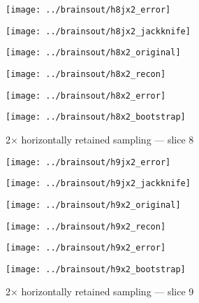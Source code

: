 \documentclass[review,supplement,onefignum,onetabnum,juq]{siamonline181217}
\begin{document}
\begin{figure}
\begin{centering}

\parbox{\imsize}{\texttt{[image: ../brainsout/h8jx2\_error]}}
\parbox{\imsize}{\texttt{[image: ../brainsout/h8jx2\_jackknife]}}

\vspace{\vertsep}

\parbox{\imsize}{\texttt{[image: ../brainsout/h8x2\_original]}}
\parbox{\imsize}{\texttt{[image: ../brainsout/h8x2\_recon]}}

\vspace{\vertsep}

\parbox{\imsize}{\texttt{[image: ../brainsout/h8x2\_error]}}
\parbox{\imsize}{\texttt{[image: ../brainsout/h8x2\_bootstrap]}}

\end{centering}
\caption{2$\times$ horizontally retained sampling --- slice 8}
\end{figure}


\begin{figure}
\begin{centering}

\parbox{\imsize}{\texttt{[image: ../brainsout/h9jx2\_error]}}
\parbox{\imsize}{\texttt{[image: ../brainsout/h9jx2\_jackknife]}}

\vspace{\vertsep}

\parbox{\imsize}{\texttt{[image: ../brainsout/h9x2\_original]}}
\parbox{\imsize}{\texttt{[image: ../brainsout/h9x2\_recon]}}

\vspace{\vertsep}

\parbox{\imsize}{\texttt{[image: ../brainsout/h9x2\_error]}}
\parbox{\imsize}{\texttt{[image: ../brainsout/h9x2\_bootstrap]}}

\end{centering}
\caption{2$\times$ horizontally retained sampling --- slice 9}
\end{figure}
\end{document}
